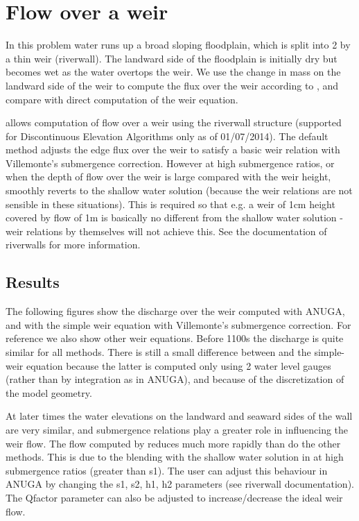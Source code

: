 
\section{Flow over a weir}

In this problem water runs up a broad sloping floodplain, which is split into 2 by a thin weir (riverwall). The landward side of the floodplain is initially dry but becomes wet as the water overtops the weir. We use the change in mass on the landward side of the weir to compute the flux over the weir according to \anuga{}, and compare with direct computation of the weir equation. 

\anuga{} allows computation of flow over a weir using the riverwall structure (supported for Discontinuous Elevation Algorithms only as of 01/07/2014). The default method adjusts the edge flux over the weir to satisfy a basic weir relation with Villemonte's submergence correction. However at high submergence ratios, or when the depth of flow over the weir is large compared with the weir height, \anuga{} smoothly reverts to the shallow water solution (because the weir relations are not sensible in these situations). This is required so that e.g. a weir of 1cm height covered by flow of 1m is basically no different from the shallow water solution - weir relations by themselves will not achieve this. See the documentation of riverwalls for more information.

\subsection{Results}

The following figures show the discharge over the weir computed with ANUGA, and with the simple weir equation with Villemonte's submergence correction. For reference we also show other weir equations. Before 1100s the discharge is quite similar for all methods. There is still a small difference between \anuga{} and the simple-weir equation because the latter is computed only using 2 water level gauges (rather than by integration as in ANUGA), and because of the discretization of the model geometry.

At later times the water elevations on the landward and seaward sides of the wall are very similar, and submergence relations play a greater role in influencing the weir flow. The flow computed by \anuga{} reduces much more rapidly than do the other methods. This is due to the blending with the shallow water solution in \anuga{} at high submergence ratios (greater than s1). The user can adjust this behaviour in ANUGA by changing the s1, s2, h1, h2 parameters (see riverwall documentation). The Qfactor parameter can also be adjusted to increase/decrease the ideal weir flow.

